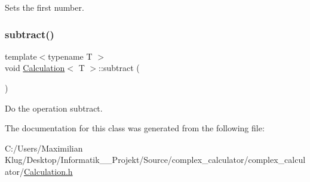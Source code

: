 Sets the first number. 

\mbox{\label{class_calculation_ad62e9335854e29e493f78e1717af2a22}} 
\subsubsection{\texorpdfstring{subtract()}{subtract()}}
{\footnotesize\ttfamily template$<$typename T $>$ \\
void \mbox{\hyperlink{class_calculation}{Calculation}}$<$ T $>$\+::subtract (\begin{DoxyParamCaption}{ }\end{DoxyParamCaption})}



Do the operation subtract. 



The documentation for this class was generated from the following file\+:\begin{DoxyCompactItemize}
\item 
C\+:/\+Users/\+Maximilian Klug/\+Desktop/\+Informatik\+\_\+\_\+\+Projekt/\+Source/complex\+\_\+calculator/complex\+\_\+calculator/\mbox{\hyperlink{_calculation_8h}{Calculation.\+h}}\end{DoxyCompactItemize}
